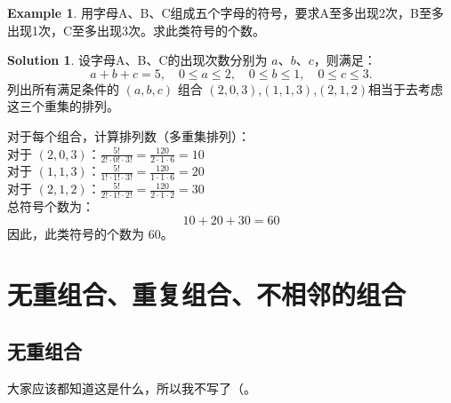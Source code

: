 \documentclass[oneside]{book}
\theoremstyle{definition}
\newtheorem{example}{Example}[section]
\newtheorem*{sol}{Solution}
\begin{document}
\begin{example}
	用字母A、B、C组成五个字母的符号，要求A至多出现2次，B至多出现1次，C至多出现3次。求此类符号的个数。
\end{example}
\begin{sol}
	设字母A、B、C的出现次数分别为 \(a\)、\(b\)、\(c\)，则满足：
	\[
	a + b + c = 5, \quad 0 \leq a \leq 2, \quad 0 \leq b \leq 1, \quad 0 \leq c \leq 3.
	\]
	列出所有满足条件的 \((a, b, c)\) 组合 \((2, 0, 3)\),\((1, 1, 3)\),\((2, 1, 2)\)相当于去考虑这三个重集的排列。
	
	对于每个组合，计算排列数（多重集排列）：\\
	对于 \((2, 0, 3)\)：\(\frac{5!}{2! \cdot 0! \cdot 3!} = \frac{120}{2 \cdot 1 \cdot 6} = 10\)\\
	对于 \((1, 1, 3)\)：\(\frac{5!}{1! \cdot 1! \cdot 3!} = \frac{120}{1 \cdot 1 \cdot 6} = 20\)\\
	对于 \((2, 1, 2)\)：\(\frac{5!}{2! \cdot 1! \cdot 2!} = \frac{120}{2 \cdot 1 \cdot 2} = 30\)\\
	总符号个数为：
	\[
	10 + 20 + 30 = 60
	\]
	因此，此类符号的个数为 60。
\end{sol}




\section{无重组合、重复组合、不相邻的组合}
\subsection{无重组合}
大家应该都知道这是什么，所以我不写了（。
\end{document}
